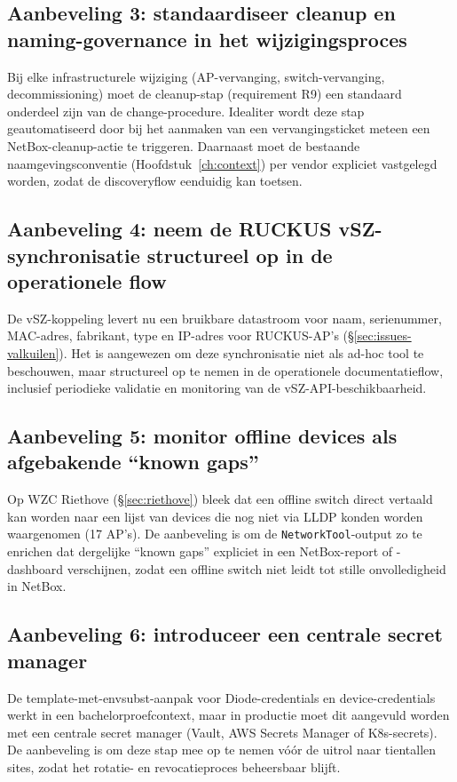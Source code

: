 \subsection{Aanbeveling 3: standaardiseer cleanup en naming-governance in het wijzigingsproces}

Bij elke infrastructurele wijziging (AP-vervanging, switch-vervanging, decommissioning) moet de cleanup-stap (requirement R9) een standaard onderdeel zijn van de change-procedure. Idealiter wordt deze stap geautomatiseerd door bij het aanmaken van een vervangingsticket meteen een NetBox-cleanup-actie te triggeren. Daarnaast moet de bestaande naamgevingsconventie (Hoofdstuk~\ref{ch:context}) per vendor expliciet vastgelegd worden, zodat de discoveryflow eenduidig kan toetsen.

\subsection{Aanbeveling 4: neem de RUCKUS vSZ-synchronisatie structureel op in de operationele flow}

De vSZ-koppeling levert nu een bruikbare datastroom voor naam, serienummer, MAC-adres, fabrikant, type en IP-adres voor RUCKUS-AP's (\S\ref{sec:issues-valkuilen}). Het is aangewezen om deze synchronisatie niet als ad-hoc tool te beschouwen, maar structureel op te nemen in de operationele documentatieflow, inclusief periodieke validatie en monitoring van de vSZ-API-beschikbaarheid.

\subsection{Aanbeveling 5: monitor offline devices als afgebakende ``known gaps''}

Op WZC Riethove (\S\ref{sec:riethove}) bleek dat een offline switch direct vertaald kan worden naar een lijst van devices die nog niet via LLDP konden worden waargenomen (17 AP's). De aanbeveling is om de \texttt{NetworkTool}-output zo te enrichen dat dergelijke ``known gaps'' expliciet in een NetBox-report of -dashboard verschijnen, zodat een offline switch niet leidt tot stille onvolledigheid in NetBox.

\subsection{Aanbeveling 6: introduceer een centrale secret manager}

De template-met-envsubst-aanpak voor Diode-credentials en device-credentials werkt in een bachelorproefcontext, maar in productie moet dit aangevuld worden met een centrale secret manager (Vault, AWS Secrets Manager of K8s-secrets). De aanbeveling is om deze stap mee op te nemen vóór de uitrol naar tientallen sites, zodat het rotatie- en revocatieproces beheersbaar blijft.

